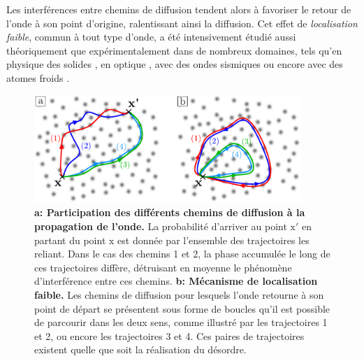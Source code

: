 Les interférences entre chemins de diffusion tendent alors à favoriser le retour de l'onde à son point d'origine, ralentissant ainsi la diffusion. Cet effet de \emph{localisation faible}, commun à tout type d'onde, a été intensivement étudié aussi théoriquement que expérimentalement dans de nombreux domaines, tels qu'en physique des solides \citep{akkermans2007mesoscopic,kramer1993localization}, en optique \citep{mishchenko1993nature,wolf1985weak}, avec des ondes sismiques \citep{larose2004weak} ou encore avec des atomes froids \citep{jendrzejewski2012coherent,muller2015suppression}.


\begin{figure}
\centering
\includegraphics[width=0.9\textwidth]{Fig/Localisation/localisation_faible.pdf}
\caption{\textbf{a: Participation des différents chemins de diffusion à la propagation de l'onde.} La probabilité d'arriver au point $\mathrm{x'}$ en partant du point $\mathrm{x}$ est donnée par l'ensemble des trajectoires les reliant. Dans le cas des chemins 1 et 2, la phase accumulée le long de ces trajectoires diffère, détruisant en moyenne le phénomène d'interférence entre ces chemins. \textbf{b: Mécanisme de localisation faible.} Les chemins de diffusion pour lesquels l'onde retourne à son point de départ se présentent sous forme de boucles qu'il est possible de parcourir dans les deux sens, comme illustré par les trajectoires 1 et 2, ou encore les trajectoires 3 et 4. Ces paires de trajectoires existent quelle que soit la réalisation du désordre.}
\label{fig:localisation_faible}
\end{figure}



